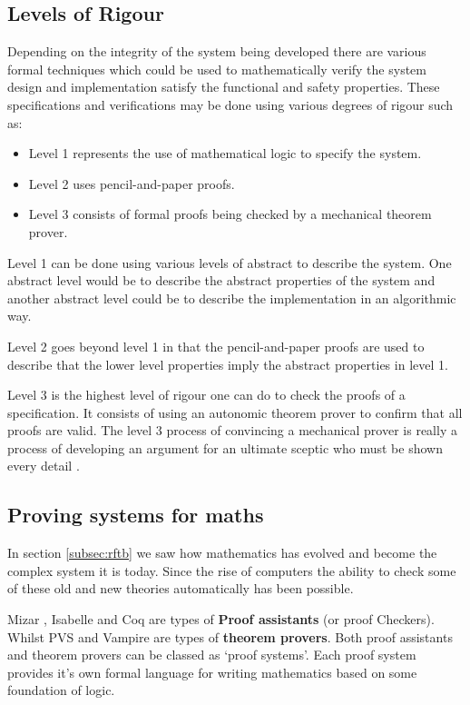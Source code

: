 \subsection{Levels of Rigour}

Depending on the integrity of the system being developed there are various formal techniques which could be used to mathematically verify the system design and implementation satisfy the functional and safety properties. These specifications and verifications may be done using various degrees of rigour such as:

\begin{itemize}
\item Level 1 represents the use of mathematical logic to specify the system.
\item Level 2 uses pencil-and-paper proofs.
\item Level 3 consists of formal proofs being checked by a mechanical theorem prover.
\end{itemize}

Level 1 can be done using various levels of abstract to describe the system. One abstract level would be to describe the abstract properties of the system and another abstract level could be to describe the implementation in an algorithmic way.

Level 2 goes beyond level 1 in that the pencil-and-paper proofs are used to describe that the lower level properties imply the abstract properties in level 1.

Level 3 is the highest level of rigour one can do to check the proofs of a specification. It consists of using an autonomic theorem prover to confirm that all proofs are valid. The level 3 process of convincing a mechanical prover is really a process of developing an argument for an ultimate sceptic who must be shown every detail \cite{encyclopedia}.

\subsection{Proving systems for maths}

In section \ref{subsec:rftb} we saw how mathematics has evolved and become the complex system it is today. Since the rise of computers the ability to check some of these old and new theories automatically has been possible.

Mizar \cite{mizar}, Isabelle \cite{isabelle} and Coq \cite{coq} are types of \textbf{Proof assistants} (or proof Checkers). Whilst PVS and Vampire are types of \textbf{theorem provers}. Both proof assistants and theorem provers can be classed as `proof systems'.
Each proof system provides it's own formal language for writing mathematics based on some foundation of logic.

